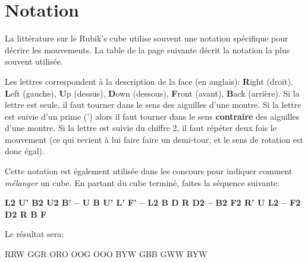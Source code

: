 \chapter{Notation}
La littérature sur le Rubik's cube utilise souvent une notation spécifique pour décrire les mouvements. La table de la page suivante décrit la notation la plus souvent utilisée.

Les lettres correspondent à la description de la face (en anglais): \textbf{R}ight (droit), \textbf{L}eft (gauche), \textbf{U}p (dessus), \textbf{D}own (dessous), \textbf{F}ront (avant), \textbf{B}ack (arrière).
Si la lettre est seule, il faut tourner dans le sens des aiguilles d'une montre.
Si la lettre est suivie d'un prime (') alors il faut tourner dans le sens \textbf{contraire} des aiguilles d'une montre. Si la lettre est suivie du chiffre 2, il faut répéter deux fois le mouvement (ce qui revient à lui faire faire un demi-tour, et le sens de rotation est donc égal).

Cette notation est également utilisée dans les concours pour indiquer comment \emph{mélanger} un cube\cite{scramble}. En partant du cube terminé, faites la séquence suivante:

\textbf{L2 U' B2 U2 B' -- U B U' L' F' -- L2 B D R D2 -- B2 F2 R' U L2 -- F2 D2 R B F}

Le résultat sera:

\begin{center}
	\RubikFaceRight%
	{R}{R}{W}%
	{G}{G}{R}%
	{O}{R}{O}
	\RubikFaceFront%
	{O}{O}{G}%
	{O}{O}{O}%
	{B}{Y}{W}
	\RubikFaceUp%
	{G}{B}{B}%
	{G}{W}{W}%
	{B}{Y}{W}
\end{center} 


